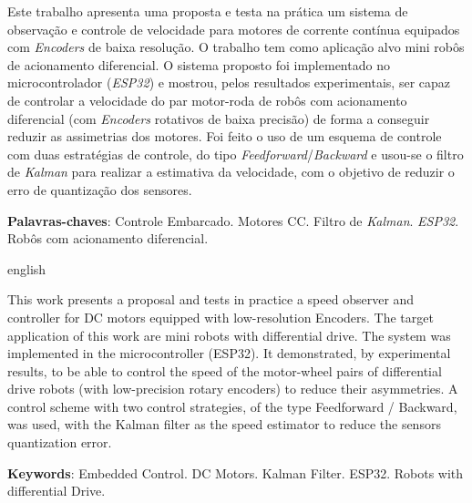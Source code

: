 \setlength{\absparsep}{18pt} %
\begin{resumo}

Este trabalho apresenta uma proposta e testa na prática um sistema de observação e controle de velocidade para motores de corrente contínua equipados com \emph{Encoders} de baixa resolução. O trabalho tem como aplicação alvo mini robôs de acionamento diferencial. O sistema proposto foi implementado no microcontrolador (\emph{ESP32}) e mostrou, pelos resultados experimentais, ser capaz de controlar a velocidade do par motor-roda de robôs com acionamento diferencial (com \emph{Encoders} rotativos de baixa precisão) de forma a conseguir reduzir as assimetrias dos motores. Foi feito o uso de um esquema de controle com duas estratégias de controle, do tipo \emph{Feedforward}/\emph{Backward} e usou-se o filtro de \emph{Kalman} para realizar a estimativa da velocidade, com o objetivo de reduzir o erro de quantização dos sensores.

 
 \textbf{Palavras-chaves}: Controle Embarcado. Motores CC. Filtro de \emph{Kalman}. \emph{ESP32}. Robôs com acionamento diferencial.
\end{resumo}
\begin{resumo}[Abstract]
	\begin{otherlanguage*}{english}
	
		This work presents a proposal and tests in practice a speed observer and controller for DC motors equipped with low-resolution Encoders. The target application of this work are mini robots with differential drive. The system was implemented in the microcontroller (ESP32). It demonstrated, by experimental results, to be able to control the speed of the motor-wheel pairs of differential drive robots (with low-precision rotary encoders) to reduce their asymmetries. A control scheme with two control strategies, of the type Feedforward / Backward, was used, with the Kalman filter as the speed estimator to reduce the sensors quantization error.
	
	\vspace{\onelineskip}
	\noindent 
	\textbf{Keywords}: Embedded Control. DC Motors. Kalman Filter. ESP32. Robots with differential Drive.
	\end{otherlanguage*}
\end{resumo}